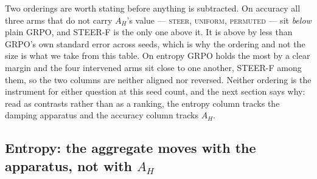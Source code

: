 \documentclass[11pt]{article}
\newcommand{\AH}{A_{H}}
\begin{document}
Two orderings are worth stating before anything is subtracted. On accuracy all
three arms that do not carry $\AH$'s value --- \textsc{steer}, \textsc{uniform},
\textsc{permuted} --- sit \emph{below} plain GRPO, and STEER-F is the only one
above it. It is above by less than GRPO's own standard error across seeds, which is
why the ordering and not the size is what we take from this table. On entropy GRPO
holds the most by a clear margin and the four intervened arms sit close to one
another, STEER-F among them, so the two columns are neither aligned nor
reversed. Neither ordering is the instrument for either question at this seed count,
and the next section says why: read as contrasts rather than as a ranking, the
entropy column tracks the damping apparatus and the accuracy column tracks $\AH$.

\subsection{Entropy: the aggregate moves with the apparatus, not with $\AH$}
\label{sec:res:entropy}
\end{document}
